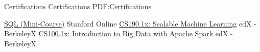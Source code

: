 
\Section
{Certifications}
{Certifications}
{PDF:Certifications}

\Entry
\BulletItem
\href{https://prod-cert-bucket.s3.amazonaws.com/downloads/fbf5d79cf19c44558bc4d29472f0cfa0/Statement.pdf}{SQL (Mini-Course)}
\hfill Stanford Online
\BulletItem
\href{https://s3.amazonaws.com/verify.edx.org/downloads/1a3787ec554649b3be0738d8f9c4f7cd/Certificate.pdf}{CS190.1x: Scalable Machine Learning}
\hfill edX - BerkeleyX
\BulletItem
\href{https://s3.amazonaws.com/verify.edx.org/downloads/ce3ef276c0d14f47b3a74bb1dc16b3ef/Certificate.pdf}{CS100.1x: Introduction to Big Data with Apache Spark}
\hfill edX - BerkeleyX